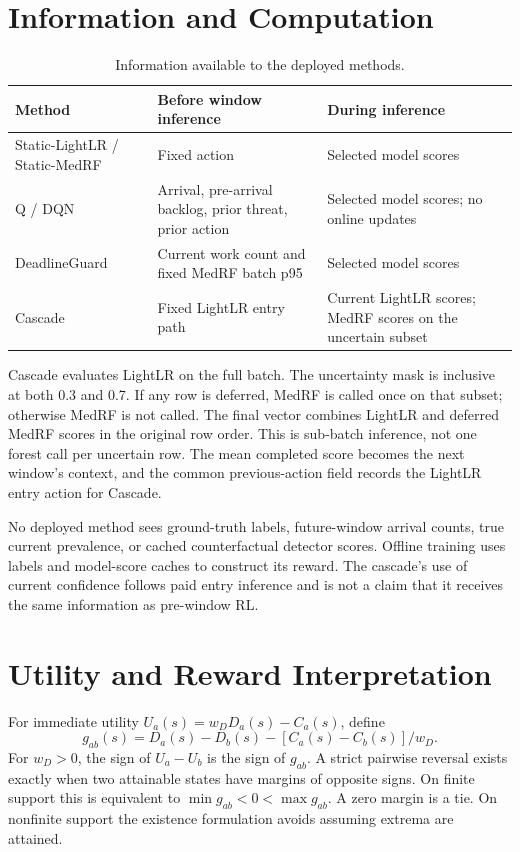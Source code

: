 \documentclass[10pt,a4paper]{article}
\begin{document}
\section{Information and Computation}\label{sec:information}
\begin{table}[h!]\centering\small
\caption{Information available to the deployed methods.}
\begin{tabular}{p{.23\linewidth}p{.33\linewidth}p{.34\linewidth}}\toprule
Method & Before window inference & During inference\\\midrule
Static-LightLR / Static-MedRF & Fixed action & Selected model scores\\
Q / DQN & Arrival, pre-arrival backlog, prior threat, prior action & Selected model scores; no online updates\\
DeadlineGuard & Current work count and fixed MedRF batch p95 & Selected model scores\\
Cascade & Fixed LightLR entry path & Current LightLR scores; MedRF scores on the uncertain subset\\\bottomrule
\end{tabular}\end{table}

Cascade evaluates LightLR on the full batch. The uncertainty mask is inclusive at both 0.3 and 0.7. If any row is deferred, MedRF is called once on that subset; otherwise MedRF is not called. The final vector combines LightLR and deferred MedRF scores in the original row order. This is sub-batch inference, not one forest call per uncertain row. The mean completed score becomes the next window's context, and the common previous-action field records the LightLR entry action for Cascade.

No deployed method sees ground-truth labels, future-window arrival counts, true current prevalence, or cached counterfactual detector scores. Offline training uses labels and model-score caches to construct its reward. The cascade's use of current confidence follows paid entry inference and is not a claim that it receives the same information as pre-window RL.

\section{Utility and Reward Interpretation}\label{sec:utility}
For immediate utility $U_a(s)=w_DD_a(s)-C_a(s)$, define
\[
g_{ab}(s)=D_a(s)-D_b(s)-[C_a(s)-C_b(s)]/w_D.
\]
For $w_D>0$, the sign of $U_a-U_b$ is the sign of $g_{ab}$. A strict pairwise reversal exists exactly when two attainable states have margins of opposite signs. On finite support this is equivalent to $\min g_{ab}<0<\max g_{ab}$. A zero margin is a tie. On nonfinite support the existence formulation avoids assuming extrema are attained.
\end{document}
